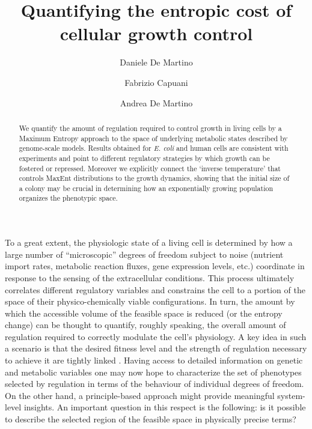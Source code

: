 \documentclass[superscriptaddress,amsmath,amssymb,twocolumn]{revtex4-1}
\begin{document}
\title{\textsf{Quantifying the entropic cost of cellular growth control}}

\author{Daniele De Martino}

\author{Fabrizio Capuani}

\author{Andrea De Martino}

\begin{abstract}
We quantify the amount of regulation required to control growth in living cells by a Maximum Entropy approach to the space of  underlying metabolic states described by genome-scale models. Results obtained for {\it E. coli} and human cells are consistent with experiments and point to different regulatory strategies by which growth can be fostered or repressed. Moreover we explicitly connect the `inverse temperature' that controls MaxEnt distributions to the growth dynamics, showing that the initial  size of a colony may be crucial in determining how an exponentially growing population organizes the phenotypic space.
\end{abstract}

\maketitle

To a great extent, the physiologic state of a living cell is determined by how a large number of ``microscopic'' degrees of freedom subject to noise (nutrient import rates, metabolic reaction fluxes, gene expression levels, etc.) coordinate in response to the sensing of the extracellular conditions. This process ultimately correlates different regulatory variables and constrains the cell to a portion of the space of their  physico-chemically viable configurations. In turn, the amount by which the accessible volume of the feasible space is reduced (or the entropy change) can be thought to quantify, roughly speaking, the overall amount of regulation required to correctly modulate the cell's physiology. A key idea in such a scenario is that the desired fitness level and the strength of regulation necessary to achieve it are tightly linked \cite{bialek,book}. Having access to detailed information on genetic and metabolic variables one may now hope to characterize the set of phenotypes selected by regulation in terms of the behaviour of individual degrees of freedom. On the other hand, a principle-based approach might provide meaningful system-level insights. An important question in this respect is the following: is it possible to describe the selected region of the feasible space in physically precise terms? 
\end{document}
